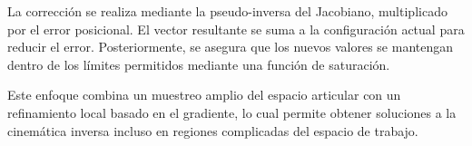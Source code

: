 La corrección se realiza mediante la pseudo-inversa del Jacobiano, multiplicado por el error posicional. El vector resultante se suma a la configuración actual para reducir el error. Posteriormente, se asegura que los nuevos valores se mantengan dentro de los límites permitidos mediante una función de saturación.

Este enfoque combina un muestreo amplio del espacio articular con un refinamiento local basado en el gradiente, lo cual permite obtener soluciones a la cinemática inversa incluso en regiones complicadas del espacio de trabajo.

